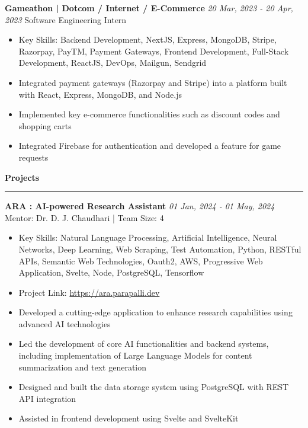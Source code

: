 \documentclass[a4paper,11pt]{article}
\renewcommand{\section}[1]{\vspace{0.5em}\textbf{\Large #1}\vspace{0.2em}\hrule\vspace{0.5em}}
\renewcommand{\subsection}[1]{\vspace{0.3em}\textbf{\large #1}\vspace{0.2em}}
\newcommand{\daterange}[2]{\textit{#1 - #2}}
\begin{document}
\subsection{Gameathon | Dotcom / Internet / E-Commerce}
\daterange{20 Mar, 2023}{20 Apr, 2023}
Software Engineering Intern
\begin{itemize}
    \item Key Skills: Backend Development, NextJS, Express, MongoDB, Stripe, Razorpay, PayTM, Payment Gateways, Frontend Development, Full-Stack Development, ReactJS, DevOps, Mailgun, Sendgrid
    \item Integrated payment gateways (Razorpay and Stripe) into a platform built with React, Express, MongoDB, and Node.js
    \item Implemented key e-commerce functionalities such as discount codes and shopping carts
    \item Integrated Firebase for authentication and developed a feature for game requests
\end{itemize}

\section{Projects}
\subsection{ARA : AI-powered Research Assistant}
\daterange{01 Jan, 2024}{01 May, 2024}
Mentor: Dr. D. J. Chaudhari | Team Size: 4
\begin{itemize}
    \item Key Skills: Natural Language Processing, Artificial Intelligence, Neural Networks, Deep Learning, Web Scraping, Test Automation, Python, RESTful APIs, Semantic Web Technologies, Oauth2, AWS, Progressive Web Application, Svelte, Node, PostgreSQL, Tensorflow
    \item Project Link: \href{https://ara.parapalli.dev}{https://ara.parapalli.dev}
    \item Developed a cutting-edge application to enhance research capabilities using advanced AI technologies
    \item Led the development of core AI functionalities and backend systems, including implementation of Large Language Models for content summarization and text generation
    \item Designed and built the data storage system using PostgreSQL with REST API integration
    \item Assisted in frontend development using Svelte and SvelteKit
\end{itemize}
\end{document}
